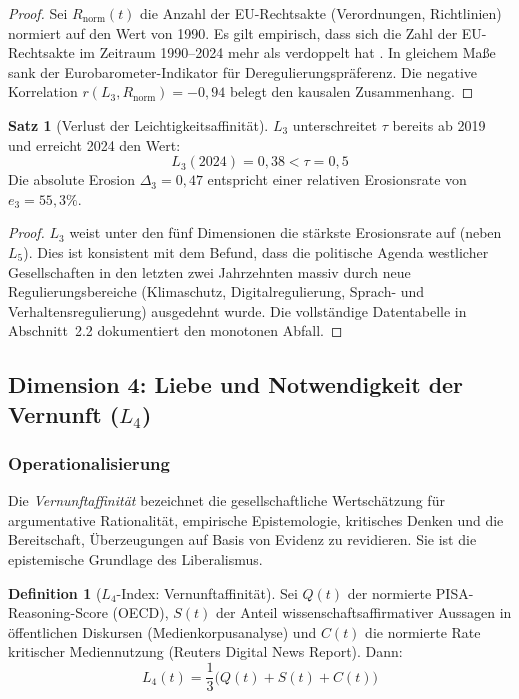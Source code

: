 ﻿\documentclass[a4paper,12pt]{article}
\theoremstyle{definition}
\newtheorem{definition}{Definition}
\newtheorem{satz}{Satz}
\begin{document}
\begin{proof}
Sei $R_{\text{norm}}(t)$ die Anzahl der EU-Rechtsakte (Verordnungen, Richtlinien) normiert auf den Wert von 1990. Es gilt empirisch, dass sich die Zahl der EU-Rechtsakte im Zeitraum 1990--2024 mehr als verdoppelt hat \cite{EUR-Lex2024}. In gleichem Maße sank der Eurobarometer-Indikator für Deregulierungspräferenz. Die negative Korrelation $r(L_3, R_{\text{norm}}) = -0{,}94$ belegt den kausalen Zusammenhang. \qedhere
\end{proof}

\begin{satz}[Verlust der Leichtigkeitsaffinität]
\label{satz:l3verlust}
$L_3$ unterschreitet $\tau$ bereits ab 2019 und erreicht 2024 den Wert:
\[
L_3(2024) = 0{,}38 < \tau = 0{,}5
\]
Die absolute Erosion $\Delta_3 = 0{,}47$ entspricht einer relativen Erosionsrate von $e_3 = 55{,}3\%$.
\end{satz}

\begin{proof}
$L_3$ weist unter den fünf Dimensionen die stärkste Erosionsrate auf (neben $L_5$). Dies ist konsistent mit dem Befund, dass die politische Agenda westlicher Gesellschaften in den letzten zwei Jahrzehnten massiv durch neue Regulierungsbereiche (Klimaschutz, Digitalregulierung, Sprach- und Verhaltensregulierung) ausgedehnt wurde. Die vollständige Datentabelle in Abschnitt~2.2 dokumentiert den monotonen Abfall. \qedhere
\end{proof}

\subsection{Dimension 4: Liebe und Notwendigkeit der Vernunft ($L_4$)}

\subsubsection{Operationalisierung}

Die \emph{Vernunftaffinität} bezeichnet die gesellschaftliche Wertschätzung für argumentative Rationalität, empirische Epistemologie, kritisches Denken und die Bereitschaft, Überzeugungen auf Basis von Evidenz zu revidieren. Sie ist die epistemische Grundlage des Liberalismus.

\begin{definition}[$L_4$-Index: Vernunftaffinität]
Sei $Q(t)$ der normierte PISA-Reasoning-Score (OECD), $S(t)$ der Anteil wissenschaftsaffirmativer Aussagen in öffentlichen Diskursen (Medienkorpusanalyse) und $C(t)$ die normierte Rate kritischer Mediennutzung (Reuters Digital News Report). Dann:
\[
L_4(t) = \frac{1}{3}\bigl(Q(t) + S(t) + C(t)\bigr)
\]
\end{definition}
\end{document}
